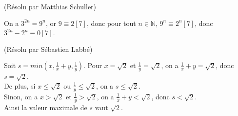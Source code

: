 \begin{sol}[1](Résolu par Matthias Schuller)

On a $3^{2n}=9^n$,
or $9 \equiv 2 [7]$,
donc pour tout $n \in \mathbb{N}$, $9^n \equiv 2^n [7]$,
donc $3^{2n}-2^n \equiv 0 [7]$.

\end{sol}

\begin{sol}[29](Résolu par Sébastien Labbé)

Soit $s=min(x,\frac{1}{x}+y, \frac{1}{y})$.
Pour $x=\sqrt{2}$ et $\frac{1}{y}=\sqrt{2}$, on a $\frac{1}{x}+y=\sqrt{2}$, donc $s=\sqrt{2}$.\\
De plus, si $x\leq \sqrt{2}$ ou $\frac{1}{y} \leq \sqrt{2}$, on a $s \leq \sqrt{2}$.\\
Sinon, on a $x> \sqrt{2}$ et $\frac{1}{y}>\sqrt{2}$, on a $\frac{1}{x}+y<\sqrt{2}$, donc $s<\sqrt{2}$.\\
Ainsi la valeur maximale de $s$ vaut $\sqrt{2}$.


\end{sol}



